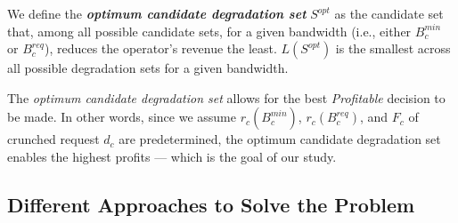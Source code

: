 \documentclass[journal]{IEEEtran}
\begin{document}
We define the \textbf{\textit{optimum candidate degradation set}} $S^{opt}$ as the candidate set that, among all possible candidate sets, for a given bandwidth (i.e., either $B_{c}^{min}$ or $B_{c}^{req}$), reduces the operator's revenue the least. $L(S^{opt})$ is the smallest across all possible degradation sets for a given bandwidth.

The \textit{optimum candidate degradation set} allows for the best \textit{Profitable} decision to be made. In other words, since we assume $r_{c}(B_{c}^{min})$, $r_{c}(B_{c}^{req})$, and $F_{c}$ of crunched request $d_c$ are predetermined, the optimum candidate degradation set enables the highest profits --- which is the goal of our study.



\subsection{Different Approaches to Solve the Problem}\label{ssec:sp_approach}
\end{document}
